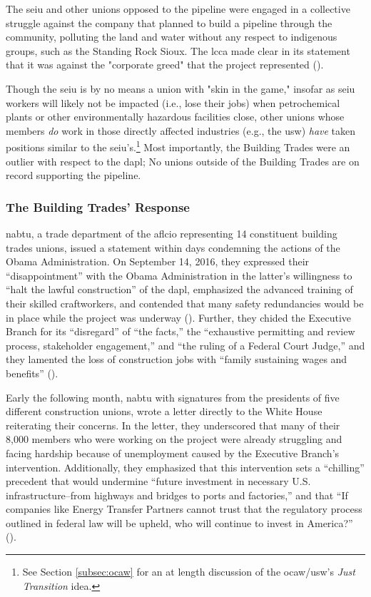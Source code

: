 \documentclass[12pt]{article}
\begin{document}
The \acrshort{seiu} and other unions opposed to the pipeline were engaged in a collective struggle against the company that planned to build a pipeline through the community, polluting the land and water without any respect to indigenous groups, such as the Standing Rock Sioux. The \acrshort{lcca} made clear in its statement that it was against the "corporate greed" that the project represented (\cite{apalaAFLCIOConstituencyGroups2016}). 

Though the \acrshort{seiu} is by no means a union with "skin in the game," insofar as \acrshort{seiu} workers will likely not be impacted (i.e., lose their jobs) when petrochemical plants or other environmentally hazardous facilities close, other unions whose members \emph{do} work in those directly affected industries (e.g., the \acrshort{usw}) \emph{have} taken positions similar to the \acrshort{seiu}'s.\footnote{See Section \ref{subsec:ocaw} for an at length discussion of the \acrshort{ocaw}/\acrshort{usw}'s \textit{Just Transition} idea.} Most importantly, the Building Trades were an outlier with respect to the \acrshort{dapl}; No unions outside of the Building Trades are on record supporting the pipeline.

\subsubsection{The Building Trades' Response}

\acrfull{nabtu}, a trade department of the \acrshort{aflcio} representing 14 constituent building trades unions, issued a statement within days condemning the actions of the Obama Administration. On September 14, 2016, they expressed their “disappointment” with the Obama Administration in the latter’s willingness to “halt the lawful construction” of the \acrshort{dapl}, emphasized the advanced training of their skilled craftworkers, and contended that many safety redundancies would be in place while the project was underway  (\cite{nabtuStatementObamaAdministration2016}). Further, they chided the Executive Branch for its “disregard” of “the facts,” the “exhaustive permitting and review process, stakeholder engagement,” and “the ruling of a Federal Court Judge,” and they lamented the loss of construction jobs with “family sustaining wages and benefits” (\cite{nabtuStatementObamaAdministration2016}).

Early the following month, \acrshort{nabtu} with signatures from the presidents of five different construction unions, wrote a letter directly to the White House reiterating their concerns. In the letter, they underscored that many of their 8,000 members who were working on the project were already struggling and facing hardship because of unemployment caused by the Executive Branch’s intervention. Additionally, they emphasized that this intervention sets a “chilling” precedent that would undermine “future investment in necessary U.S. infrastructure–from highways and bridges to ports and factories,” and that “If companies like Energy Transfer Partners cannot trust that the regulatory process outlined in federal law will be upheld, who will continue to invest in America?” (\cite{callahanLetterObama2016}).
\end{document}
